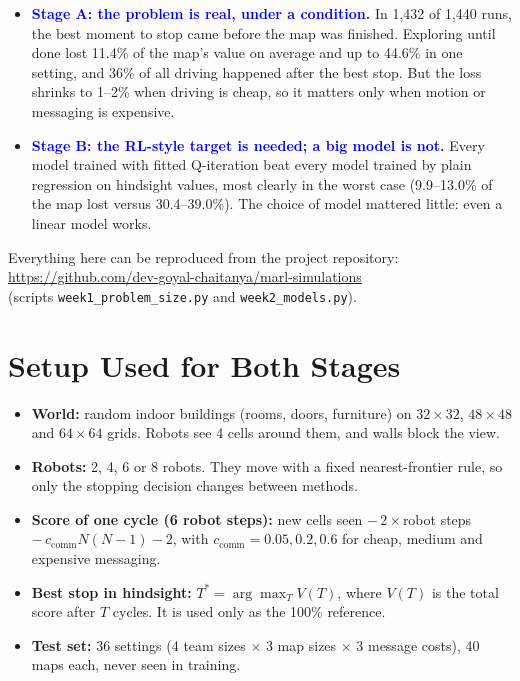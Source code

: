 \documentclass[11pt,a4paper]{article}
\newcommand{\key}[1]{\textcolor{blue}{\textbf{#1}}}
\begin{document}
\begin{itemize}
  \item \key{Stage A: the problem is real, under a condition.} In 1,432 of 1,440 runs, the best moment to stop came before the map was finished. Exploring until done lost 11.4\% of the map's value on average and up to 44.6\% in one setting, and 36\% of all driving happened after the best stop. But the loss shrinks to 1--2\% when driving is cheap, so it matters only when motion or messaging is expensive.
  \item \key{Stage B: the RL-style target is needed; a big model is not.} Every model trained with fitted Q-iteration beat every model trained by plain regression on hindsight values, most clearly in the worst case (9.9--13.0\% of the map lost versus 30.4--39.0\%). The choice of model mattered little: even a linear model works.
\end{itemize}

Everything here can be reproduced from the project repository:\\
\url{https://github.com/dev-goyal-chaitanya/marl-simulations}\\
(scripts \texttt{week1\_problem\_size.py} and \texttt{week2\_models.py}).

\section{Setup Used for Both Stages}

\begin{itemize}
  \item \textbf{World:} random indoor buildings (rooms, doors, furniture) on $32\times32$, $48\times48$ and $64\times64$ grids. Robots see 4 cells around them, and walls block the view.
  \item \textbf{Robots:} 2, 4, 6 or 8 robots. They move with a fixed nearest-frontier rule, so only the stopping decision changes between methods.
  \item \textbf{Score of one cycle (6 robot steps):} new cells seen $-\,2\times$robot steps $-\,c_{\text{comm}} N(N-1) - 2$, with $c_{\text{comm}} = 0.05, 0.2, 0.6$ for cheap, medium and expensive messaging.
  \item \textbf{Best stop in hindsight:} $T^* = \arg\max_T V(T)$, where $V(T)$ is the total score after $T$ cycles. It is used only as the 100\% reference.
  \item \textbf{Test set:} 36 settings (4 team sizes $\times$ 3 map sizes $\times$ 3 message costs), 40 maps each, never seen in training.
\end{itemize}
\end{document}
